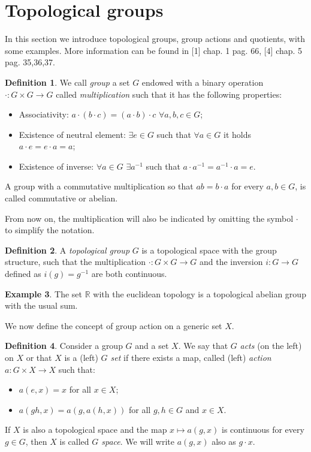\documentclass[12pt,a4paper]{report}
\theoremstyle{definition}
\newtheorem{Def}{Definition}[chapter]
\theoremstyle{Theorem}
\theoremstyle{definition}
\newtheorem{Ex}[Def]{Example}
\theoremstyle{definition}
\begin{document}
	\section{Topological groups}
	In this section we introduce topological groups, group actions and quotients, with some examples. More information can be found in [1] chap. 1 pag. 66, [4] chap. 5 pag. 35,36,37. 
	\begin{Def}
		We call \textit{group} a set $G$ endowed with a binary operation $\cdot:G\times G\rightarrow G$ called \textit{multiplication} such that it has the following properties:
		\begin{itemize}
			\item Associativity: $a\cdot (b\cdot c)=(a\cdot b)\cdot c$ $\forall a,b,c\in G$;
			\item Existence of neutral element: $\exists e\in G$ such that $\forall a\in G$ it holds $a\cdot e=e\cdot a=a$;
			\item Existence of inverse: $\forall a\in G$ $\exists a^{-1}$ such that $a\cdot a^{-1}=a^{-1}\cdot a=e$.
		\end{itemize}
		A group with a commutative multiplication so that $ab= b\cdot a$ for every $a,b\in G$, is called commutative or abelian.
	\end{Def}
	From now on, the multiplication will also be indicated by omitting the symbol $\cdot$ to simplify the notation.
	\begin{Def}
		A \textit{topological group} $G$ is a topological space with the group structure, such that the multiplication $\cdot:G\times G\rightarrow G$ and the inversion $i:G\rightarrow G$ defined as $i(g)=g^{-1}$ are both continuous.
	\end{Def}
	\begin{Ex}
		The set $\mathbb{R}$ with the euclidean topology is a topological abelian group with the usual sum.
	\end{Ex}
	We now define the concept of group action on a generic set $X$.
	\begin{Def}
		Consider a group $G$ and a set $X$. We say that $G$ \textit{acts} (on the left) on $X$ or that $X$ is a (left) \textit{$G$ set} if there exists a map, called (left) \textit{action} $a:G\times X\rightarrow X$ such that:
		\begin{itemize}
			\item 	$a(e,x)=x$ for all $x\in X$;
			\item $a(gh,x)=a(g,a(h,x))$ for all $g,h\in G$ and $x\in X$.
		\end{itemize} 
		If $X$ is also a topological space and the map $x\longmapsto a(g,x)$ is continuous for every $g\in G$, then $X$ is called \textit{$G$ space}.
		We will write $a(g,x)$ also as $g\cdot x$.
	\end{Def}
\end{document}
